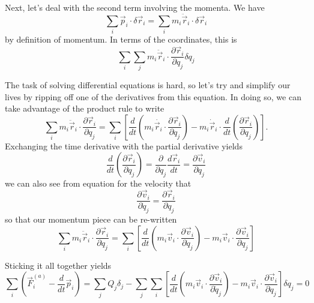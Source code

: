 \documentclass{article}
\begin{document}
Next, let's deal with the second term involving the momenta. We have 
\begin{equation}
  \sum_i \vec{p}_i \cdot \delta\vec{r}_i = \sum_i m_i\ddot{\vec{r}}_i\cdot \delta \vec{r}_i
\end{equation}
by definition of momentum. In terms of the coordinates, this is
\begin{equation}
  \sum_i\sum_j m_i\ddot{\vec{r}}_i \cdot \frac{\partial \vec{r}_i}{\partial q_j}\delta q_j
\end{equation}

The task of solving differential equations is hard, so let's try and simplify
our lives by ripping off one of the derivatives from this equation.
In doing so, we can take advantage of the product rule to write
\begin{equation}
  \sum_i m_i\ddot{\vec{r}}_i\cdot\frac{\partial \vec{r}_i}{\partial q_j} =
  \sum_i\left[ \frac{d}{dt}\left( m_i\dot{\vec{r}_i}\cdot\frac{\partial \vec{r}_i}{\partial q_j} \right)
  - m_i\dot{\vec{r}}_i\cdot \frac{d}{dt}\left( \frac{\partial \vec{r}_i}{\partial q_j} \right)\right].
\end{equation}
Exchanging the time derivative with the partial derivative yields
\begin{equation}
  \frac{d}{dt}\left( \frac{\partial \vec{r}_i}{\partial q_j} \right) = \frac{\partial}{\partial q_j}\frac{d\vec{r}_i}{dt} = \frac{\partial \vec{v}_i}{\partial q_j}
\end{equation}
we can also see from equation for the velocity that
\begin{equation}
  \frac{\partial \vec{v}_i}{\partial \dot{{q}}_j} = \frac{\partial \vec{r}_i}{\partial q_j}
\end{equation}
so that our momentum piece can be re-written
\begin{equation}
  \sum_i m_i\ddot{\vec{r}}_i\cdot\frac{\partial \vec{r}_i}{\partial q_j} =
  \sum_i\left[ \frac{d}{dt}\left( m_i\vec{v}_i\cdot \frac{\partial \vec{v}_i}{\partial \dot{{q}}_j} \right)
  - m_i\vec{v}_i\cdot\frac{\partial \vec{v}_i}{\partial q_j}\right]
\end{equation}

Sticking it all together yields
\begin{equation}
  \sum_i\left( \vec{F}_i^{(a)}-\frac{d}{dt}\vec{p}_i \right) =
  \sum_j Q_j\delta_j - \sum_j   \sum_i\left[ \frac{d}{dt}\left( m_i\vec{v}_i\cdot
      \frac{\partial \vec{v}_i}{\partial \dot{{q}}_j} \right)
    - m_i\vec{v}_i\cdot\frac{\partial \vec{v}_i}{\partial q_j}\right]\delta q_j = 0 
\end{equation}
\end{document}
